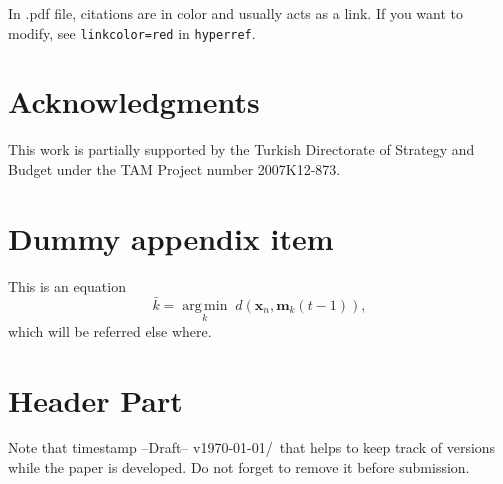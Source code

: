 \documentclass[pre,twocolumn,showkeys,longbibliography]{revtex4-1}
\newcommand{\hbTimeStamp}{{\color{red}--Draft-- v\today/\currenttime}} %
\newcommand{\hCode}[1]{\texttt{#1}}
\newcommand{\hArgmin}[2]{\underset{#1}{\operatorname{arg \, min}}\;#2}
\theoremstyle{plain}
\theoremstyle{definition}
\theoremstyle{remark}
\begin{document}
In .pdf file, citations are in color and usually acts as a link.
If you want to modify,
see 
\hCode{linkcolor=red}
in 
\hCode{hyperref}.






\section*{Acknowledgments}

This work is partially supported by 
the Turkish Directorate of Strategy and Budget
under the TAM Project number 2007K12-873.





\appendix
\newcommand{\hbAppendixPrefix}{A}
%
\renewcommand{\thefigure}{\hbAppendixPrefix\arabic{figure}}
\setcounter{figure}{0}
\renewcommand{\thetable}{\hbAppendixPrefix\arabic{table}} 
\setcounter{table}{0}
\renewcommand{\theequation}{\hbAppendixPrefix\arabic{equation}} 
\setcounter{equation}{0}




\section{Dummy appendix item}
	\label{sec:dummyAppendix}


This is an equation
\begin{equation}
	\label{eq:equationInAppendix}
	\bar{k} = \hArgmin{k} d(\mathbf{x}_{n},  \mathbf{m}_{k}(t-1)),
\end{equation}
which will be referred else where.




\section{Header Part}

Note that timestamp \hbTimeStamp\ that helps to keep track of versions while the paper is developed.
Do not forget to remove it before submission.





\end{document}
